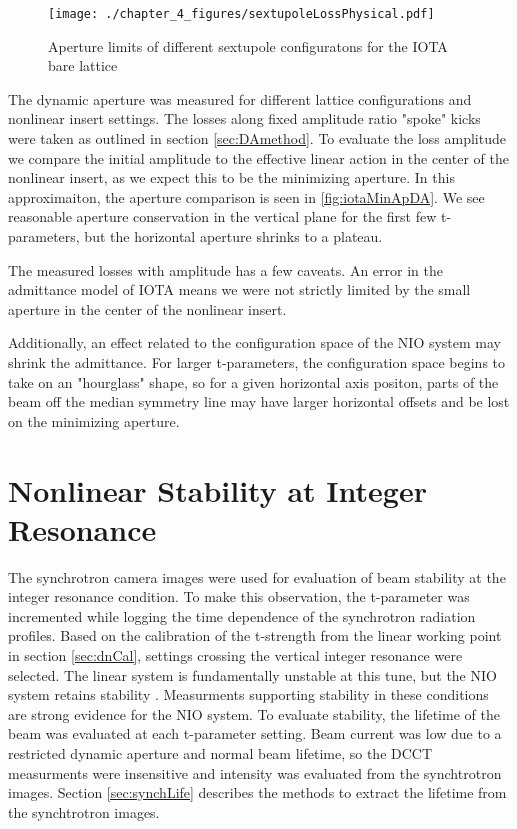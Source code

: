 \begin{figure}
	\centering
	\texttt{[image: ./chapter\_4\_figures/sextupoleLossPhysical.pdf]}
	\caption{Aperture limits of different sextupole configuratons for the IOTA bare lattice}
	\label{fig:bareDA}
\end{figure}

The dynamic aperture was measured for different lattice configurations and nonlinear insert settings. The losses along fixed amplitude ratio "spoke" kicks were taken as outlined in section \ref{sec:DAmethod}. To evaluate the loss amplitude we compare the initial amplitude to the effective linear action in the center of the nonlinear insert, as we expect this to be the minimizing aperture. In this approximaiton, the aperture comparison is seen in \ref{fig:iotaMinApDA}. We see reasonable aperture conservation in the vertical plane for the first few t-parameters, but the horizontal aperture shrinks to a plateau.

The measured losses with amplitude has a few caveats. An error in the admittance model of IOTA means we were not strictly limited by the small aperture in the center of the nonlinear insert.

Additionally, an effect related to the configuration space of the NIO system may shrink the admittance. For larger t-parameters, the configuration space begins to take on an "hourglass" shape, so for a given horizontal axis positon, parts of the beam off the median symmetry line may have larger horizontal offsets and be lost on the minimizing aperture.

\section{Nonlinear Stability at Integer Resonance} \label{sec:intCross}
The synchrotron camera images were used for evaluation of beam stability at the integer resonance condition. To make this observation, the t-parameter was incremented while logging the time dependence of the synchrotron radiation profiles. Based on the calibration of the t-strength from the linear working point in section \ref{sec:dnCal}, settings crossing the vertical integer resonance were selected. The linear system is fundamentally unstable at this tune, but the NIO system retains stability . Measurments supporting stability in these conditions are strong evidence for the NIO system. To evaluate stability, the lifetime of the beam was evaluated at each t-parameter setting. Beam current was low due to a restricted dynamic aperture and normal beam lifetime, so the DCCT measurments were insensitive and intensity was evaluated from the synchtrotron images. Section \ref{sec:synchLife} describes the methods to extract the lifetime from the synchtrotron images.

